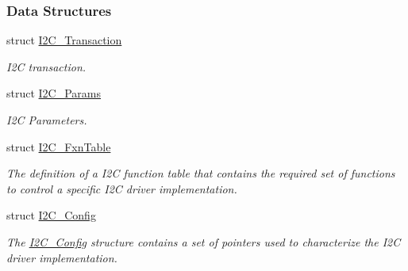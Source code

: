 \subsubsection*{Data Structures}
\begin{DoxyCompactItemize}
\item 
struct \hyperlink{struct_i2_c___transaction}{I2\-C\-\_\-\-Transaction}
\begin{DoxyCompactList}\small\item\em I2\-C transaction. \end{DoxyCompactList}\item 
struct \hyperlink{struct_i2_c___params}{I2\-C\-\_\-\-Params}
\begin{DoxyCompactList}\small\item\em I2\-C Parameters. \end{DoxyCompactList}\item 
struct \hyperlink{struct_i2_c___fxn_table}{I2\-C\-\_\-\-Fxn\-Table}
\begin{DoxyCompactList}\small\item\em The definition of a I2\-C function table that contains the required set of functions to control a specific I2\-C driver implementation. \end{DoxyCompactList}\item 
struct \hyperlink{struct_i2_c___config}{I2\-C\-\_\-\-Config}
\begin{DoxyCompactList}\small\item\em The \hyperlink{struct_i2_c___config}{I2\-C\-\_\-\-Config} structure contains a set of pointers used to characterize the I2\-C driver implementation. \end{DoxyCompactList}\end{DoxyCompactItemize}
